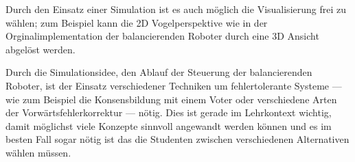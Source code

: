 Durch den Einsatz einer Simulation ist es auch m{\"{o}}glich die Visualisierung frei zu w{\"{a}}hlen; zum Beispiel kann die 2D
Vogelperspektive wie in der Orginalimplementation der balancierenden Roboter durch eine 3D Ansicht abgel{\"{o}}st werden.

Durch die Simulationsidee, den Ablauf der Steuerung der balancierenden Roboter, ist der Einsatz verschiedener Techniken um
fehlertolerante Systeme --- wie zum Beispiel die Konsensbildung mit einem Voter oder verschiedene Arten der Vorw{\"{a}}rtsfehlerkorrektur ---
n{\"{o}}tig. Dies ist gerade im Lehrkontext wichtig, damit m{\"{o}}glichst viele Konzepte sinnvoll angewandt werden
k{\"{o}}nnen und es im besten Fall sogar n{\"{o}}tig ist das die Studenten zwischen verschiedenen Alternativen w{\"{a}}hlen
m{\"{u}}ssen.
